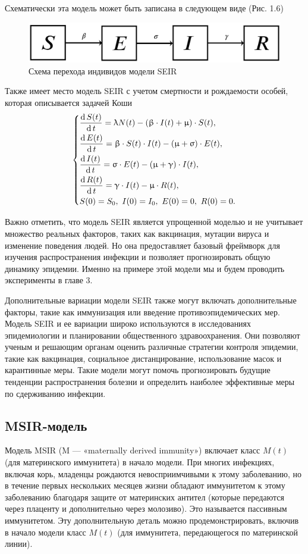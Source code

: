 \documentclass[a4paper, 14pt]{extreport}
\renewcommand{\beta}{\upbeta}
\renewcommand{\gamma}{\upgamma}
\renewcommand{\sigma}{\upsigma}
\renewcommand{\lambda}{\uplambda}
\renewcommand{\mu}{\upmu}
\renewcommand{\d}{\operatorname{d}}
\begin{document}
	Схематически эта модель может быть записана в следующем виде (Рис. 1.6)
	\begin{figure}[h]
		\centering
		\includegraphics[scale=0.3]{images/img08}
		\caption{Схема перехода индивидов модели SEIR}
		\label{fig:img08}
	\end{figure}
	
	
	Также имеет место модель SEIR с учетом смертности и рождаемости особей, которая описывается задачей Коши
	\begin{equation}
	\begin{dcases}
		\dfrac {\d S(t)}{\d t} = \lambda N(t) - (\beta \cdot I(t) +\mu)\cdot S(t),\\
	\dfrac {\d E(t)}{\d t} = \beta \cdot S(t)\cdot I(t) - (\mu + \sigma)\cdot E(t),\\
	\dfrac{\d I(t)}{\d t} =\sigma \cdot E(t) - (\mu + \gamma)\cdot I(t),\\
	\dfrac{\d R(t)}{\d t} = \gamma\cdot I(t) - \mu \cdot R(t),\\
	S(0) = S_0,\ I(0) = I_0,\ E(0) = 0,\ R(0) = 0.
	\end{dcases}
	\end{equation}
	
	
	Важно отметить, что модель SEIR является упрощенной моделью и не учитывает множество реальных факторов, таких как вакцинация, мутации вируса и изменение поведения людей. Но она предоставляет базовый фреймворк для изучения распространения инфекции и позволяет прогнозировать общую динамику эпидемии.
	Именно на примере этой модели мы и будем проводить эксперименты в главе 3.
	
	Дополнительные вариации модели SEIR также могут включать дополнительные факторы, такие как иммунизация или введение противоэпидемических мер. Модель SEIR и ее вариации широко используются в исследованиях эпидемиологии и планировании общественного здравоохранения. Они позволяют ученым и решающим органам оценить различные стратегии контроля эпидемии, такие как вакцинация, социальное дистанцирование, использование масок и карантинные меры. Такие модели могут помочь прогнозировать будущие тенденции распространения болезни и определить наиболее эффективные меры по сдерживанию инфекции.
	
	\subsection{MSIR-модель}
	Модель MSIR (M — «maternally derived immunity») включает класс $M(t)$ (для материнского иммунитета) в начало модели. При многих инфекциях, включая корь, младенцы рождаются невосприимчивыми к этому заболеванию, но в течение первых нескольких месяцев жизни обладают иммунитетом к этому заболеванию благодаря защите от материнских антител (которые передаются через плаценту и дополнительно через молозиво). Это называется пассивным иммунитетом. Эту дополнительную деталь можно продемонстрировать, включив в начало модели класс $M(t)$ (для иммунитета, передающегося по материнской линии). 
	
\end{document}
